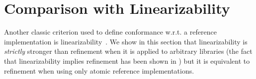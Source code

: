 \section{Comparison with Linearizability}
\label{sec:lin}


Another classic criterion used to define conformance w.r.t. a reference implementation is
linearizability~\cite{journals/toplas/HerlihyW90}. We show in this section that
linearizability is \emph{strictly} stronger than refinement when it is applied to arbitrary libraries 
(the fact that linearizability implies refinement has been shown in \citet{journals/tcs/FilipovicORY10})
but it is equivalent to
refinement when using only atomic reference implementations.


